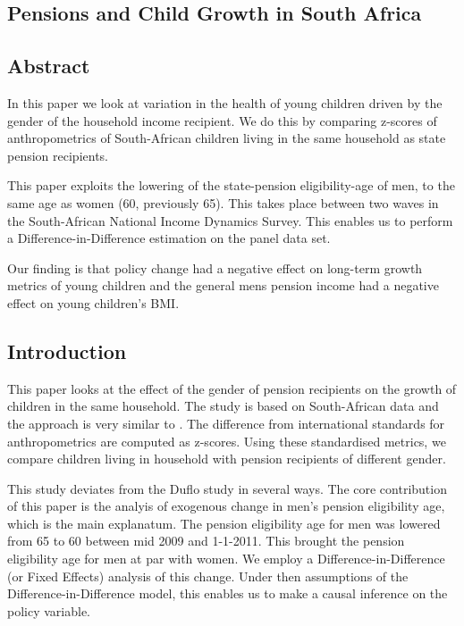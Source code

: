 \begin{refsection}
\chapter{Pensions and Child Growth in South Africa}
\label{sa}
\section*{Abstract}
In this paper we look at variation in the health of young children driven by the gender of the household income recipient.
We do this by comparing z-scores of anthropometrics of South-African children living in the same household as state pension recipients.

This paper exploits the lowering of the state-pension eligibility-age of men, 
to the same age as women (60, previously 65).
This takes place between two waves in the South-African National Income Dynamics Survey.
This enables us to perform a Difference-in-Difference estimation on the panel data set.

Our finding is that policy change had a negative effect on long-term growth metrics of young children
and the general mens pension income had a negative effect on young children's BMI.

\section{Introduction}
\label{sa:intro}
This paper looks at the effect of the gender of pension recipients on the growth of children in the same household.
The study is based on South-African data and the approach is very similar to \textcite{duflo2000child,duflo2003grandmothers}.
The difference from international standards \parencite[WHO Child Growth Standards]{who2006child} for anthropometrics are computed as z-scores.
Using these standardised metrics, we compare children living in household with pension recipients of different gender.

This study deviates from the Duflo study in several ways.
The core contribution of this paper is the analyis of exogenous change in men's pension eligibility age,
which is the main explanatum.
The pension eligibility age for men was lowered from 65 to 60 between mid 2009 and 1-1-2011.
This brought the pension eligibility age for men at par with women.
We employ a Difference-in-Difference (or Fixed Effects) analysis of this change.
Under then assumptions of the Difference-in-Difference model,
this enables us to make a causal inference on the policy variable.


\end{refsection}
